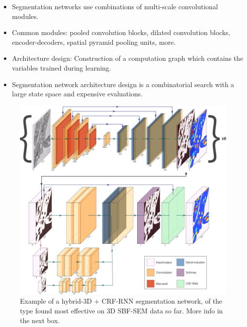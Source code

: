 \documentclass[final]{beamer}
\newlength{\onecolwid}
\renewcommand{\emph}[1]{{\color{nibib2} #1}}
\begin{document}
\begin{frame}[t]
\begin{columns}[t]
\begin{column}{\onecolwid}
\begin{tcolorbox}[title=Network Architecture Design]
\begin{itemize}
\item Segmentation networks use combinations of \emph{multi-scale convolutional} modules.
\item Common modules: pooled convolution blocks, dilated convolution blocks, encoder-decoders, spatial pyramid pooling units, more.
\item \emph{Architecture design}: Construction of a computation graph which contains the variables trained during learning.
\item Segmentation network architecture design is a combinatorial search with a \emph{large state space} and \emph{expensive evaluations}.
\end{itemize}
\end{tcolorbox}

\begin{center}
\begin{figure}
\includegraphics[width=\linewidth]{fig/fullnet-rearranged.png}
\caption{Example of a hybrid-3D + CRF-RNN segmentation network, of the type found most effective on 3D SBF-SEM data so far. More info in the next box.}
\end{figure}
\end{center}


\end{column}
\end{columns}
\end{frame}
\end{document}
